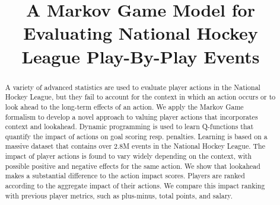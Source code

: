 \documentclass[]{article}
\title{A Markov Game Model for Evaluating National Hockey League Play-By-Play Events}
\author{} %
\begin{document}
\maketitle

\begin{abstract}
A variety of advanced statistics are used to evaluate player actions in the National Hockey League, but they fail to account for the context in which an action occurs or to look ahead to the long-term effects of an action. We apply the Markov Game formalism to develop a novel approach to valuing player actions that incorporates context and lookahead. Dynamic programming is used to learn Q-functions that quantify the impact of actions on goal scoring resp. penalties. Learning is based on a massive dataset that contains over 2.8M events in the National Hockey League.
The impact of player actions is found to vary widely depending on the context, with possible positive and negative effects for the same action. We show that lookahead makes a substantial difference to the action impact scores.
Players are ranked according to the aggregate impact of their actions. We compare this impact ranking with previous player metrics, such as plus-minus, total points, and salary.
\end{abstract}


\end{document}
